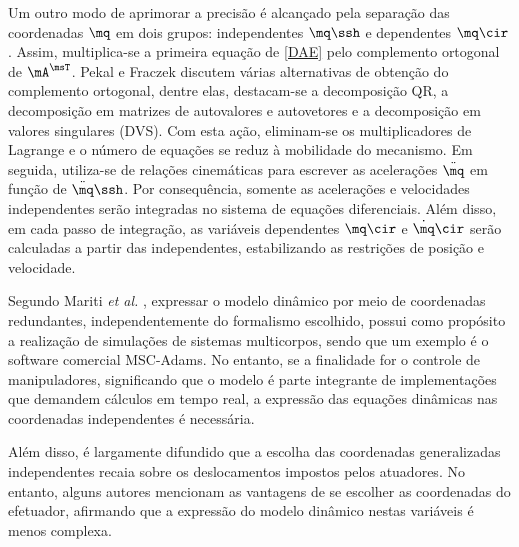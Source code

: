 \documentclass[]{politex}
\begin{document}

Um outro modo de aprimorar a precisão é alcançado pela separação das coordenadas $\mq$ em dois grupos: independentes $\mq\ssh$ e dependentes $\mq\cir$. Assim, multiplica-se a primeira equação de \eqref{DAE} pelo complemento ortogonal \cite{Kordjazi} de $\mA^\msT$. Pekal e Fraczek \cite{Pekal} discutem várias alternativas de obtenção do complemento ortogonal, dentre elas, destacam-se a decomposição QR, a decomposição em matrizes de autovalores e autovetores e a decomposição em valores singulares (DVS). Com esta ação, eliminam-se os multiplicadores de Lagrange e o número de equações se reduz à mobilidade do mecanismo. Em seguida, utiliza-se de relações cinemáticas para  escrever as acelerações $\ddot{\mq}$ em função de $\ddot{\mq}\ssh$. Por consequência, somente as acelerações e velocidades independentes serão integradas no sistema de equações diferenciais. Além disso, em cada passo de integração, as variáveis dependentes $\mq\cir$ e $\dot{\mq}\cir$ serão calculadas a partir das independentes, estabilizando as restrições de posição e velocidade.


Segundo Mariti \emph{et al.} \cite{Mariti}, expressar o modelo dinâmico por meio de coordenadas redundantes, independentemente do formalismo escolhido, possui como propósito a realização de simulações de sistemas multicorpos, sendo que um exemplo é o software comercial MSC-Adams. No entanto, se a finalidade for o controle de manipuladores, significando que o modelo é parte integrante de implementações que demandem  cálculos em tempo real, a expressão das equações dinâmicas nas coordenadas independentes é necessária.

Além disso, é largamente difundido que a escolha das coordenadas generalizadas independentes recaia sobre os deslocamentos impostos pelos atuadores. No entanto, alguns autores \cite{Li, Khalil2} mencionam as vantagens de se escolher as coordenadas do efetuador, afirmando que a expressão do modelo dinâmico nestas variáveis é menos complexa.
\end{document}
